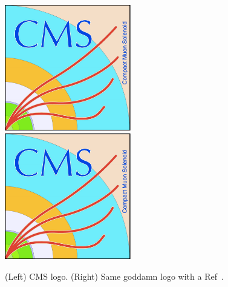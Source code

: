\clearpage
\begin{figure}[t]
  \begin{center}
    \includegraphics[width=0.49\textwidth]{supplementary/figures/CMS_logo} \,
    \includegraphics[width=0.49\textwidth]{supplementary/figures/CMS_logo} \\
  \end{center}
  \caption{
    (Left) CMS logo. 
    (Right) Same goddamn logo with a Ref~\cite{Chatrchyan:2008zzk}. 
    \label{fig:cms_logo} 
  }
\end{figure}

